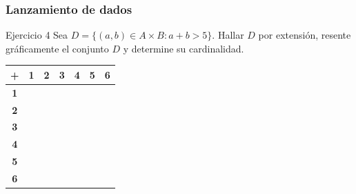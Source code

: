 \documentclass[aspectratio=169]{beamer}
\begin{document}
\begin{frame}[t]
	\frametitle{Lanzamiento de dados}
	\begin{block}{Ejercicio 4}
		Sea $D=\{(a, b)\in A\times B: a+b>5\}$. Hallar $D$ por extensión, resente gráficamente el conjunto $D$ y determine su cardinalidad.
	\end{block}


	\renewcommand{\arraystretch}{1.3} %
	\begin{flushleft}
		\begin{tabular}{|c|*{6}{c|}}
			\hline
			\cellcolor{gray!30} \textbf{+}
			                                & \cellcolor{yellow} \textbf{1}
			                                & \cellcolor{yellow} \textbf{2}
			                                & \cellcolor{yellow} \textbf{3}
			                                & \cellcolor{yellow} \textbf{4}
			                                & \cellcolor{yellow} \textbf{5}
			                                & \cellcolor{yellow} \textbf{6}               \\
			\hline
			\cellcolor{green!70} \textbf{1} &                               &  &  &  &  & \\ \hline
			\cellcolor{green!70} \textbf{2} &                               &  &  &  &  & \\ \hline
			\cellcolor{green!70} \textbf{3} &                               &  &  &  &  & \\ \hline
			\cellcolor{green!70} \textbf{4} &                               &  &  &  &  & \\ \hline
			\cellcolor{green!70} \textbf{5} &                               &  &  &  &  & \\ \hline
			\cellcolor{green!70} \textbf{6} &                               &  &  &  &  & \\
			\hline
		\end{tabular}
	\end{flushleft}



\end{frame}
\end{document}
